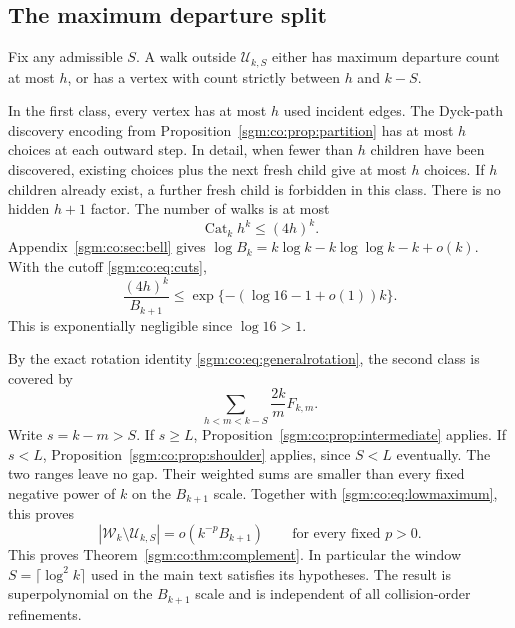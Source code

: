 \documentclass[11pt,letterpaper]{article}
\theoremstyle{remark}\newtheorem{remark}[theorem]{Remark}
\newcommand{\Wc}{\mathcal W}\newcommand{\Uc}{\mathcal U}\newcommand{\Part}{\operatorname{Part}}
\newcommand{\Cat}{\operatorname{Cat}}\newcommand{\E}{\mathbb E}\newcommand{\Prob}{\mathbb P}\newcommand{\ind}{\mathbf 1}
\theoremstyle{definition}\newtheorem{definition}[theorem]{Definition}
\begin{document}
\subsection{The maximum departure split}\label{sgm:co:sec:lowmaximum}
Fix any admissible $S$. A walk outside $\Uc_{k,S}$ either has maximum departure count at most $h$, or has a vertex with count strictly between $h$ and $k-S$.

In the first class, every vertex has at most $h$ used incident edges. The Dyck-path discovery encoding from Proposition~\ref{sgm:co:prop:partition} has at most $h$ choices at each outward step. In detail, when fewer than $h$ children have been discovered, existing choices plus the next fresh child give at most $h$ choices. If $h$ children already exist, a further fresh child is forbidden in this class. There is no hidden $h+1$ factor. The number of walks is at most
\[
 \Cat_kh^k\le(4h)^k.
\]
Appendix~\ref{sgm:co:sec:bell} gives $\log B_k=k\log k-k\log\log k-k+o(k)$. With the cutoff \eqref{sgm:co:eq:cuts},
\begin{equation}\label{sgm:co:eq:lowmaximum}
 \frac{(4h)^k}{B_{k+1}}
 \le\exp\{-(\log16-1+o(1))k\}.
\end{equation}
This is exponentially negligible since $\log16>1$.

By the exact rotation identity \eqref{sgm:co:eq:generalrotation}, the second class is covered by
\begin{equation}\label{sgm:co:eq:covercomplement}
 \sum_{h<m<k-S}\frac{2k}{m}F_{k,m}.
\end{equation}
Write $s=k-m>S$. If $s\ge L$, Proposition~\ref{sgm:co:prop:intermediate} applies. If $s<L$, Proposition~\ref{sgm:co:prop:shoulder} applies, since $S<L$ eventually. The two ranges leave no gap. Their weighted sums are smaller than every fixed negative power of $k$ on the $B_{k+1}$ scale. Together with \eqref{sgm:co:eq:lowmaximum}, this proves
\begin{equation}\label{sgm:co:eq:complementproved}
 |\Wc_k\setminus\Uc_{k,S}|=o(k^{-p}B_{k+1})\qquad\text{for every fixed }p>0.
\end{equation}
This proves Theorem~\ref{sgm:co:thm:complement}. In particular the window $S=\lceil\log^2k\rceil$ used in the main text satisfies its hypotheses. The result is superpolynomial on the $B_{k+1}$ scale and is independent of all collision-order refinements.
\end{document}
